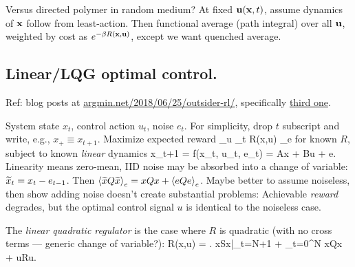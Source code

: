 \documentclass[notitlepage,openany,11pt]{report}
\theoremstyle{plain}%
\numberwithin{equation}{section}
\begin{document}
Versus directed polymer in random medium? At fixed $\mathbf{u}(\mathbf{x},t)$, assume dynamics of $\mathbf{x}$ follow from least-action. Then functional average (path integral) over all $\mathbf{u}$, weighted by cost as $e^{-\beta R(\mathbf{x},\mathbf{u})}$, except we want quenched average.


\subsection{Linear/LQG optimal control.}

Ref: blog posts at \href{http://www.argmin.net/2018/06/25/outsider-rl/}{argmin.net/2018/06/25/outsider-rl/}, specifically \href{http://www.argmin.net/2018/02/08/lqr/}{third one}.

System state $x_{t}$, control action $u_{t}$, noise $e_{t}$. For simplicity, drop $t$ subscript and write, e.g., $x_{+} \equiv x_{t+1}$. Maximize expected reward
\be
\arg \max_{u} \left\langle \sum_{t} R(x,u) \right\rangle_{e}
\ee
for known $R$, subject to known \emph{linear} dynamics
\be
x_{t+1} = f(x_{t}, u_{t}, e_{t}) = Ax + Bu + e.
\ee
Linearity means zero-mean, IID noise may be absorbed into a change of variable: $\widetilde{x}_{t} = x_{t} - e_{t-1}$. Then $\left\langle \widetilde{x} Q \widetilde{x} \right\rangle_{e} = xQx + \left\langle e Q e \right\rangle_{e}$. Maybe better to assume noiseless, then show adding noise doesn't create substantial problems: Achievable \emph{reward} degrades, but the optimal control signal $u$ is identical to the noiseless case.

The \emph{linear quadratic regulator} is the case where $R$ is quadratic (with no cross terms --- generic change of variable?):
\be
R(x,u) = \left. xSx\right|_{t=N+1} +  \sum_{t=0}^{N} xQx + uRu.
\ee
{}
\end{document}
